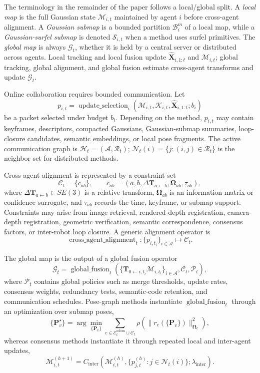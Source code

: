\documentclass[11pt, a4paper, logo]{googledeepmind}
\begin{document}
The terminology in the remainder of the paper follows a local/global split. A \emph{local map} is the full Gaussian state $\mathcal{M}_{i,t}$ maintained by agent $i$ before cross-agent alignment. A \emph{Gaussian submap} is a bounded partition $\mathcal{B}_{i}^{m}$ of a local map, while a \emph{Gaussian-surfel submap} is denoted $\mathcal{S}_{i,t}$ when a method uses surfel primitives. The \emph{global map} is always $\mathcal{G}_t$, whether it is held by a central server or distributed across agents. Local tracking and local fusion update $\hat{\mathbf{X}}_{i,1:t}$ and $\mathcal{M}_{i,t}$; global tracking, global alignment, and global fusion estimate cross-agent transforms and update $\mathcal{G}_t$.

Online collaboration requires bounded communication. Let
\[
p_{i,t}=\operatorname{update\_selection}_i(\mathcal{M}_{i,t},\mathcal{K}_{i,t},\hat{\mathbf{X}}_{i,1:t};b_i)
\]
be a packet selected under budget $b_i$. Depending on the method, $p_{i,t}$ may contain keyframes, descriptors, compacted Gaussians, Gaussian-submap summaries, loop-closure candidates, semantic embeddings, or local pose fragments. The active communication graph is $\mathcal{H}_t=(\mathcal{A},\mathcal{R}_t)$; $\mathcal{N}_t(i)=\{j:(i,j)\in\mathcal{R}_t\}$ is the neighbor set for distributed methods.

Cross-agent alignment is represented by a constraint set
\[
\mathcal{C}_t=\{c_{ab}\},\qquad
c_{ab}=(a,b,\Delta\mathbf{T}_{a\leftarrow b},\boldsymbol{\Omega}_{ab},\tau_{ab}),
\]
where $\Delta\mathbf{T}_{a\leftarrow b}\in SE(3)$ is a relative transform, $\boldsymbol{\Omega}_{ab}$ is an information matrix or confidence surrogate, and $\tau_{ab}$ records the time, keyframe, or submap support. Constraints may arise from image retrieval, rendered-depth registration, camera-depth registration, geometric verification, semantic correspondence, consensus factors, or inter-robot loop closure. A generic alignment operator is
\[
\operatorname{cross\_agent\_alignment}_t:\{p_{i,t_i}\}_{i\in\mathcal{A}}
\mapsto \mathcal{C}_t.
\]

The global map is the output of a global fusion operator
\[
\mathcal{G}_t
=\operatorname{global\_fusion}_t\!\left(\{\mathbf{T}_{0\leftarrow i,t_i}\mathcal{M}_{i,t_i}\}_{i\in\mathcal{A}},
\mathcal{C}_t,
\mathcal{P}_t\right),
\]
where $\mathcal{P}_t$ contains global policies such as merge thresholds, update rates, consensus weights, redundancy tests, semantic-code retention, and communication schedules. Pose-graph methods instantiate $\operatorname{global\_fusion}_t$ through an optimization over submap poses,
\[
\{\mathbf{P}_v^\star\}
=\arg\min_{\{\mathbf{P}_v\}}
\sum_{e\in\mathcal{E}^{\mathrm{odom}}_t\cup\mathcal{C}_t}
\rho\!\left(\|r_e(\{\mathbf{P}_v\})\|_{\boldsymbol{\Omega}_e}^{2}\right),
\]
whereas consensus methods instantiate it through repeated local and inter-agent updates,
\[
\mathcal{M}_{i,t}^{(h+1)}
=C_{\mathrm{inter}}\!\left(\mathcal{M}_{i,t}^{(h)},
\{p_{j,t}^{(h)}:j\in\mathcal{N}_t(i)\};\lambda_{\mathrm{inter}}\right).
\]
\end{document}
